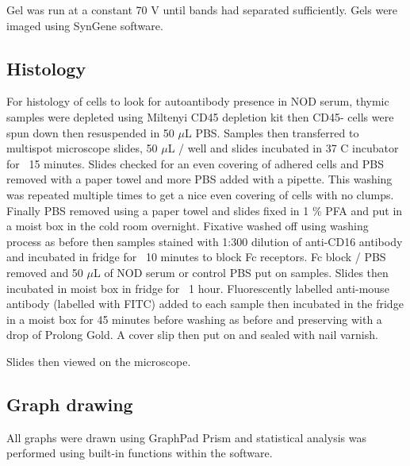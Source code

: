 Gel was run at a constant 70 V until bands had separated sufficiently.
Gels were imaged using SynGene software.

\subsection{Histology}

For histology of cells to look for autoantibody presence in NOD serum, thymic samples were depleted using Miltenyi CD45 depletion kit then CD45- cells were spun down then resuspended in 50 $\mu$L PBS.
Samples then transferred to multispot microscope slides, 50 $\mu$L / well and slides incubated in 37 \textdegree C incubator for ~15 minutes.
Slides checked for an even covering of adhered cells and PBS removed with a paper towel and more PBS added with a pipette. 
This washing was repeated multiple times to get a nice even covering of cells with no clumps.
Finally PBS removed using a paper towel and slides fixed in 1 \% PFA and put in a moist box in the cold room overnight.
Fixative washed off using washing process as before then samples stained with 1:300 dilution of anti-CD16 antibody and incubated in fridge for ~10 minutes to block Fc receptors.
Fc block / PBS removed and 50 $\mu$L of NOD serum or control PBS put on samples.
Slides then incubated in moist box in fridge for ~1 hour.
Fluorescently labelled anti-mouse antibody (labelled with FITC) added to each sample then incubated in the fridge in a moist box for 45 minutes before washing as before and preserving with a drop of Prolong Gold.
A cover slip then put on and sealed with nail varnish.

Slides then viewed on the microscope.


\subsection{Graph drawing}

All graphs were drawn using GraphPad Prism and statistical analysis was performed using built-in functions within the software.
